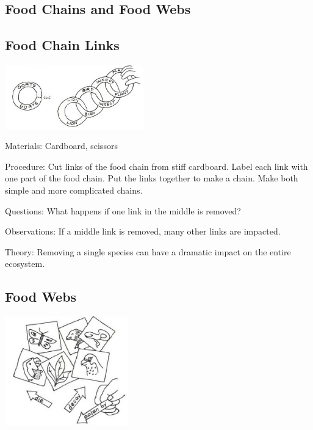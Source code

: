 \begin{multicols}{2}
\columnbreak


\section*{Food Chains and Food Webs}


\subsection{Food Chain Links} %

\begin{center}
\includegraphics[width=0.45\textwidth]{./img/vso/food-chain-links.jpg}
\end{center}

\begin{description*}
\item[Materials:]{Cardboard, scissors}
\item[Procedure:]{Cut links of the food chain from
stiff cardboard. Label each link
with one part of the food chain.
Put the links together to make a
chain. Make both simple and more complicated chains.}
\item[Questions:]{What happens if one link in the middle is removed?}
\item[Observations:]{If a middle link is removed, many other links are impacted.}
\item[Theory:]{Removing a single species can have a dramatic impact on the entire ecosystem.}
\end{description*}

\subsection{Food Webs} %

\begin{center}
\includegraphics[width=0.4\textwidth]{./img/vso/food-webs.jpg}
\end{center}


\end{multicols}
